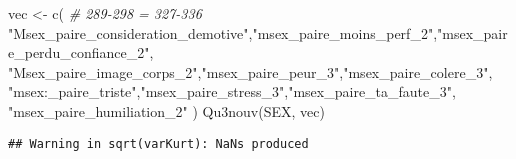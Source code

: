 \documentclass[
]{article}
\newenvironment{Shaded}{\begin{snugshade}}{\end{snugshade}}
\newcommand{\CommentTok}[1]{\textcolor[rgb]{0.56,0.35,0.01}{\textit{#1}}}
\newcommand{\FunctionTok}[1]{\textcolor[rgb]{0.00,0.00,0.00}{#1}}
\newcommand{\NormalTok}[1]{#1}
\newcommand{\OtherTok}[1]{\textcolor[rgb]{0.56,0.35,0.01}{#1}}
\newcommand{\StringTok}[1]{\textcolor[rgb]{0.31,0.60,0.02}{#1}}
\begin{document}
\begin{Shaded}
\begin{Highlighting}[]
\NormalTok{vec }\OtherTok{\textless{}{-}} \FunctionTok{c}\NormalTok{(  }\CommentTok{\# 289{-}298 = 327{-}336}
  \StringTok{"Msex\_paire\_consideration\_demotive"}\NormalTok{,}\StringTok{"msex\_paire\_moins\_perf\_2"}\NormalTok{,}\StringTok{"msex\_paire\_perdu\_confiance\_2"}\NormalTok{,}
  \StringTok{"Msex\_paire\_image\_corps\_2"}\NormalTok{,}\StringTok{"msex\_paire\_peur\_3"}\NormalTok{,}\StringTok{"msex\_paire\_colere\_3"}\NormalTok{,}
  \StringTok{"msex:\_paire\_triste"}\NormalTok{,}\StringTok{"msex\_paire\_stress\_3"}\NormalTok{,}\StringTok{"msex\_paire\_ta\_faute\_3"}\NormalTok{,}
  \StringTok{"msex\_paire\_humiliation\_2"}
\NormalTok{  )}
\FunctionTok{Qu3nouv}\NormalTok{(SEX, vec)}
\end{Highlighting}
\end{Shaded}

\begin{verbatim}
## Warning in sqrt(varKurt): NaNs produced
\end{verbatim}
\end{document}
